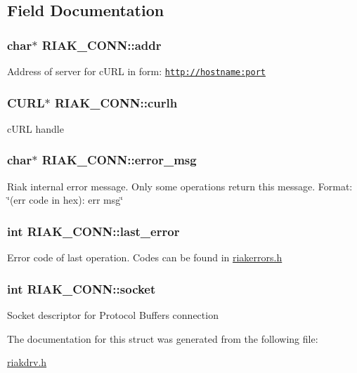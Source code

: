 \subsection{Field Documentation}
\hypertarget{structRIAK__CONN_acdbc16cd5909783c8a43996bcfedde74}{
\subsubsection[{addr}]{\setlength{\rightskip}{0pt plus 5cm}char$\ast$ {\bf RIAK\_\-CONN::addr}}}
\label{structRIAK__CONN_acdbc16cd5909783c8a43996bcfedde74}
Address of server for cURL in form: \href{http://hostname:port}{\tt http://hostname:port} \hypertarget{structRIAK__CONN_a0c48f72b62d6eb51a7449c6fb3d93e3f}{
\subsubsection[{curlh}]{\setlength{\rightskip}{0pt plus 5cm}CURL$\ast$ {\bf RIAK\_\-CONN::curlh}}}
\label{structRIAK__CONN_a0c48f72b62d6eb51a7449c6fb3d93e3f}
cURL handle \hypertarget{structRIAK__CONN_a81357b1e5540c2347a8d10af43146647}{
\subsubsection[{error\_\-msg}]{\setlength{\rightskip}{0pt plus 5cm}char$\ast$ {\bf RIAK\_\-CONN::error\_\-msg}}}
\label{structRIAK__CONN_a81357b1e5540c2347a8d10af43146647}
Riak internal error message. Only some operations return this message. Format: \char`\"{}(err code in hex): err msg\char`\"{} \hypertarget{structRIAK__CONN_a45438c019b304f62a48fa4b7bd04c456}{
\subsubsection[{last\_\-error}]{\setlength{\rightskip}{0pt plus 5cm}int {\bf RIAK\_\-CONN::last\_\-error}}}
\label{structRIAK__CONN_a45438c019b304f62a48fa4b7bd04c456}
Error code of last operation. Codes can be found in \hyperlink{riakerrors_8h}{riakerrors.h} \hypertarget{structRIAK__CONN_a2e3f4865323a6a35ef1b2bdccaaef497}{
\subsubsection[{socket}]{\setlength{\rightskip}{0pt plus 5cm}int {\bf RIAK\_\-CONN::socket}}}
\label{structRIAK__CONN_a2e3f4865323a6a35ef1b2bdccaaef497}
Socket descriptor for Protocol Buffers connection 

The documentation for this struct was generated from the following file:\begin{DoxyCompactItemize}
\item 
\hyperlink{riakdrv_8h}{riakdrv.h}\end{DoxyCompactItemize}
